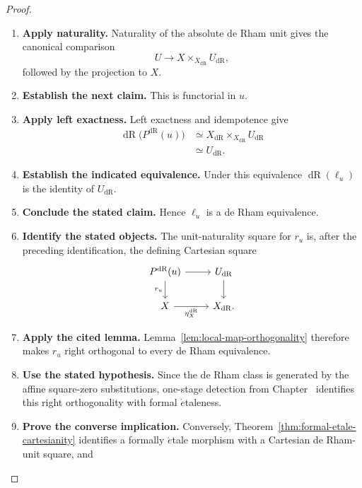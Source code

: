 \begin{proof}
\leavevmode
\begin{enumerate}[label=\textup{(\arabic*)}]
    \item \textbf{Apply naturality.}
    Naturality of the absolute de Rham unit gives the canonical comparison
    \[
    U\longrightarrow X\times_{X_{\mathrm{dR}}}U_{\mathrm{dR}},
    \]
    followed by the projection to \(X\).
    \item \textbf{Establish the next claim.}
    This is functorial in \(u\).
    \item \textbf{Apply left exactness.}
    Left exactness and idempotence give
    \[
    \begin{aligned}
    \operatorname{dR}\bigl(P^{\mathrm{dR}}(u)\bigr)
    &\simeq
    X_{\mathrm{dR}}
    \times_{X_{\mathrm{dR}}}
    U_{\mathrm{dR}}\\
    &\simeq U_{\mathrm{dR}}.
    \end{aligned}
    \]
    \item \textbf{Establish the indicated equivalence.}
    Under this equivalence \(\operatorname{dR}(\ell_u)\) is the identity of
    \(U_{\mathrm{dR}}\).
    \item \textbf{Conclude the stated claim.}
    Hence \(\ell_u\) is a de Rham equivalence.
    \item \textbf{Identify the stated objects.}
    The unit-naturality square for \(r_u\) is, after the preceding identification,
    the defining Cartesian square
    \[
    \begin{tikzcd}
    P^{\mathrm{dR}}(u) \ar[r] \ar[d,"r_u"']
    & U_{\mathrm{dR}} \ar[d]\\
    X \ar[r,"\eta_X^{\mathrm{dR}}"'] & X_{\mathrm{dR}}.
    \end{tikzcd}
    \]
    \item \textbf{Apply the cited lemma.}
    Lemma~\ref{lem:local-map-orthogonality} therefore makes \(r_u\) right
    orthogonal to every de Rham equivalence.
    \item \textbf{Use the stated hypothesis.}
    Since the de Rham class is generated
    by the affine square-zero substitutions, one-stage detection from
    Chapter~ identifies this right
    orthogonality with formal \(\acute{e}\)taleness.
    \item \textbf{Prove the converse implication.}
    Conversely, Theorem~\ref{thm:formal-etale-cartesianity} identifies a formally
    \(\acute{e}\)tale morphism with a Cartesian de Rham-unit square, and

\end{enumerate}
\end{proof}
